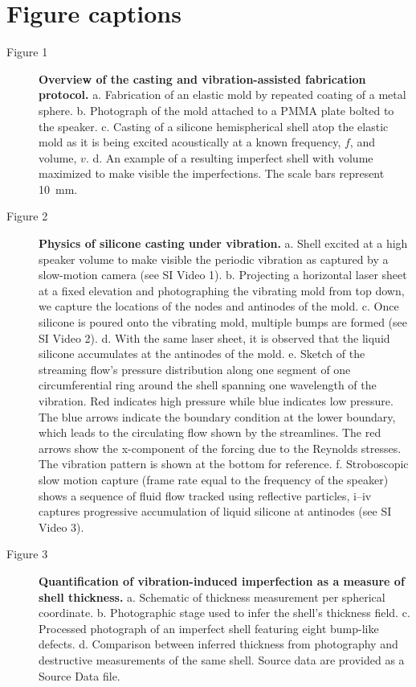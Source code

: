 \documentclass[twocolumn,letter,11pt]{article}
\begin{document}
\section*{Figure captions} 
\begin{description}
\item[Figure 1] \textbf{Overview of the casting and vibration-assisted fabrication protocol.} a. Fabrication of an elastic mold by repeated coating of a metal sphere. b. Photograph of the mold attached to a PMMA plate bolted to the speaker. c. Casting of a silicone hemispherical shell atop the elastic mold as it is being excited acoustically at a known frequency, $f$, and volume, $v$. d. An example of a resulting imperfect shell with volume maximized to make visible the imperfections. The scale bars represent \SI{10}{\milli\metre}.
\item[Figure 2] \textbf{Physics of silicone casting under vibration.}
a. Shell excited at a high speaker volume to make visible the periodic vibration as captured by a slow-motion camera (see SI Video 1). b. Projecting a horizontal laser sheet at a fixed elevation and photographing the vibrating mold from top down, we capture the locations of the nodes and antinodes of the mold. c. Once silicone is poured onto the vibrating mold, multiple bumps are formed (see SI Video 2). d. With the same laser sheet, it is observed that the liquid silicone accumulates at the antinodes of the mold. e. Sketch of the streaming flow's pressure distribution along one segment of one circumferential ring around the shell spanning one wavelength of the vibration. Red indicates high pressure while blue indicates low pressure. The blue arrows indicate the boundary condition at the lower boundary, which leads to the circulating flow shown by the streamlines. The red arrows show the x-component of the forcing due to the Reynolds stresses. The vibration pattern is shown at the bottom for reference. f. Stroboscopic slow motion capture (frame rate equal to the frequency of the speaker) shows a sequence of fluid flow tracked using reflective particles, i–iv captures progressive accumulation of liquid silicone at antinodes (see SI Video 3).
\item[Figure 3] \textbf{Quantification of vibration-induced imperfection as a measure of shell thickness.} a. Schematic of thickness measurement per spherical coordinate. b. Photographic stage used to infer the shell's thickness field. c. Processed photograph of an imperfect shell featuring eight bump-like defects. d. Comparison between inferred thickness from photography and destructive measurements of the same shell. Source data are provided as a Source Data file.

\end{description}
\end{document}
